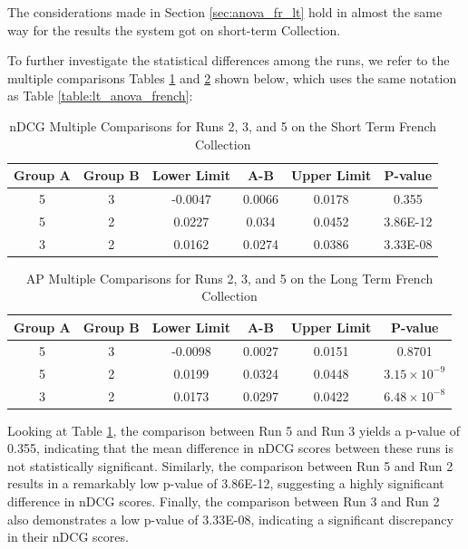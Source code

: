 The considerations made in Section \ref{sec:anova_fr_lt} hold in almost the same way for the results the system got on short-term Collection.  

To further investigate the statistical differences among the runs, we refer to the multiple comparisons Tables \ref{table:st_anova_french} and \ref{table:st_anova_french_ap} shown below, which uses the same notation as Table \ref{table:lt_anova_french}:

\begin{table}[!h]
    \centering
    \caption{\ac{nDCG} Multiple Comparisons for Runs 2, 3, and 5 on the Short Term French Collection}
    \label{table:st_anova_french}
    \begin{tabular}{cccccc}
    \hline
    Group A & Group B & Lower Limit & A-B & Upper Limit & P-value \\ \hline
    5 & 3 & -0.0047 & 0.0066 & 0.0178 & 0.355 \\
    5 & 2 & 0.0227 & 0.034 & 0.0452 & 3.86E-12 \\
    3 & 2 & 0.0162 & 0.0274 & 0.0386 & 3.33E-08 \\ \hline
    \end{tabular}
\end{table}

\begin{table}[!h]
    \centering
    \caption{\ac{AP} Multiple Comparisons for Runs 2, 3, and 5 on the Long Term French Collection}
    \label{table:st_anova_french_ap}
    \begin{tabular}{cccccc}
    \hline
    Group A & Group B & Lower Limit & A-B & Upper Limit & P-value \\ \hline
    5 & 3 & -0.0098 & 0.0027 & 0.0151 & 0.8701 \\
    5 & 2 & 0.0199 & 0.0324 & 0.0448 & $3.15 \times 10^{-9}$ \\
    3 & 2 & 0.0173 & 0.0297 & 0.0422 & $6.48 \times 10^{-8}$ \\ \hline
    \end{tabular}
\end{table}
 
Looking at Table \ref{table:st_anova_french}, the comparison between Run 5 and Run 3 yields a p-value of 0.355, indicating that the mean difference in \ac{nDCG} scores between these runs is not statistically significant. 
Similarly, the comparison between Run 5 and Run 2 results in a remarkably low p-value of 3.86E-12, suggesting a highly significant difference in \ac{nDCG} scores. 
Finally, the comparison between Run 3 and Run 2 also demonstrates a low p-value of 3.33E-08, indicating a significant discrepancy in their \ac{nDCG} scores.

